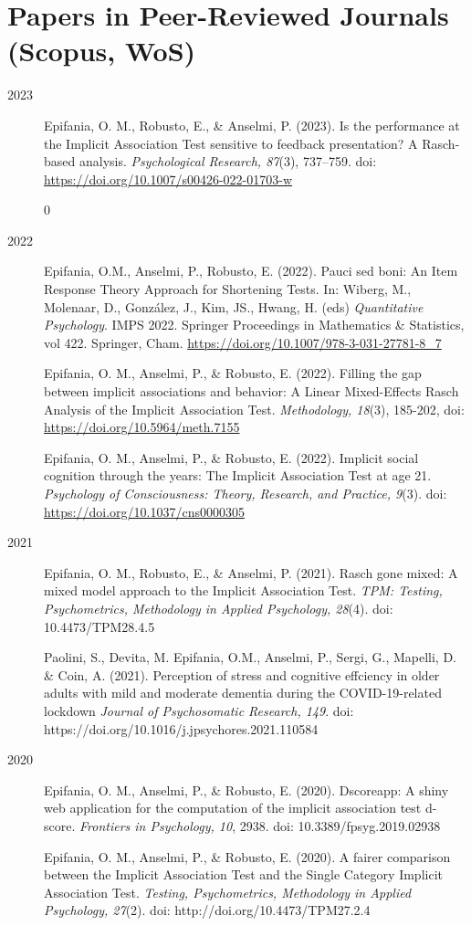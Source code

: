\documentclass[letterpaper,12pt]{article}
\begin{document}
\section{Papers in Peer-Reviewed Journals (Scopus, WoS)}
\begin{description}
	\item[2023]


\item[] Epifania, O. M., Robusto, E., \& Anselmi, P. (2023). Is the performance at the Implicit Association Test sensitive to feedback presentation? A Rasch-based analysis. \emph{Psychological
	Research, 87}(3), 737--759. doi: \href{https://doi.org/10.1007/s00426-022-01703-w}{https://doi.org/10.1007/s00426-022-01703-w}

0
	\item[2022] 
	\item[] Epifania, O.M., Anselmi, P., Robusto, E. (2022). Pauci sed boni: An Item Response Theory Approach for Shortening Tests. In: Wiberg, M., Molenaar, D., González, J., Kim, JS., Hwang, H. (eds) \emph{Quantitative Psychology}. IMPS 2022. Springer Proceedings in Mathematics \& Statistics, vol 422. Springer, Cham. \url{https://doi.org/10.1007/978-3-031-27781-8_7}
\item[] Epifania, O. M., Anselmi, P., \& Robusto, E. (2022). Filling the gap between implicit associations and behavior: A Linear Mixed-Effects Rasch Analysis of the Implicit Association Test. \emph{Methodology, 18}(3), 185-202, doi: \url{https://doi.org/10.5964/meth.7155}
\item[] Epifania, O. M., Anselmi, P., \& Robusto, E. (2022). Implicit social cognition through the years: The Implicit Association Test at age 21. \emph{Psychology of Consciousness: Theory, Research, and Practice, 9}(3). doi: \url{https://doi.org/10.1037/cns0000305}

\item[2021] 
\item[] Epifania, O. M., Robusto, E., \& Anselmi, P. (2021). Rasch gone mixed: A mixed model approach to the Implicit Association Test. \emph{TPM: Testing, Psychometrics, Methodology in Applied Psychology, 28}(4). doi: 10.4473/TPM28.4.5
\item[] Paolini, S., Devita, M. Epifania, O.M., Anselmi, P., Sergi, G., Mapelli, D. \& Coin, A. (2021). Perception of stress and cognitive effciency in older adults with mild and moderate dementia during the COVID-19-related lockdown \emph{Journal of Psychosomatic Research, 149}. doi: https://doi.org/10.1016/j.jpsychores.2021.110584
\item [2020]
\item[] Epifania, O. M., Anselmi, P., \& Robusto, E. (2020). Dscoreapp: A shiny web application for the computation of the implicit association test d-score. \emph{Frontiers in Psychology, 10}, 2938. doi: 10.3389/fpsyg.2019.02938
\item[] Epifania, O. M., Anselmi, P., \& Robusto, E. (2020). A fairer comparison between the Implicit Association Test and the Single Category Implicit Association Test. \emph{Testing, Psychometrics, Methodology in Applied Psychology, 27}(2). doi: http://doi.org/10.4473/TPM27.2.4
\end{description}
\end{document}
